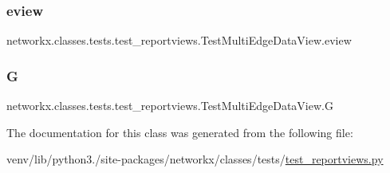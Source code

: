 \subsubsection{\texorpdfstring{eview}{eview}}
{\footnotesize\ttfamily networkx.\+classes.\+tests.\+test\+\_\+reportviews.\+Test\+Multi\+Edge\+Data\+View.\+eview}

\mbox{\label{classnetworkx_1_1classes_1_1tests_1_1test__reportviews_1_1TestMultiEdgeDataView_a7b85f0566801bfde7575a3eff42200ac}} 
\subsubsection{\texorpdfstring{G}{G}}
{\footnotesize\ttfamily networkx.\+classes.\+tests.\+test\+\_\+reportviews.\+Test\+Multi\+Edge\+Data\+View.\+G}



The documentation for this class was generated from the following file\+:\begin{DoxyCompactItemize}
\item 
venv/lib/python3./site-\/packages/networkx/classes/tests/\hyperlink{test__reportviews_8py}{test\+\_\+reportviews.\+py}\end{DoxyCompactItemize}
